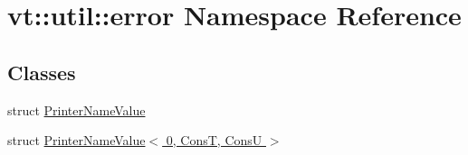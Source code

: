 \hypertarget{namespacevt_1_1util_1_1error}{}\section{vt\+:\+:util\+:\+:error Namespace Reference}
\label{namespacevt_1_1util_1_1error}
\subsection*{Classes}
\begin{DoxyCompactItemize}
\item 
struct \hyperlink{structvt_1_1util_1_1error_1_1_printer_name_value}{Printer\+Name\+Value}
\item 
struct \hyperlink{structvt_1_1util_1_1error_1_1_printer_name_value_3_010_00_01_cons_t_00_01_cons_u_01_4}{Printer\+Name\+Value$<$ 0, Cons\+T, Cons\+U $>$}
\end{DoxyCompactItemize}
